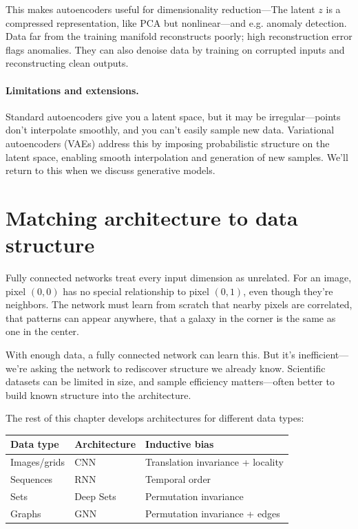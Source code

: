 \documentclass[11pt]{article}
\begin{document}
This makes autoencoders useful for dimensionality reduction---The latent $z$ is a compressed representation, like PCA but nonlinear---and e.g. anomaly detection. Data far from the training manifold reconstructs poorly; high reconstruction error flags anomalies. They can also denoise data by training on corrupted inputs and reconstructing clean outputs.

\paragraph{Limitations and extensions.} Standard autoencoders give you a latent space, but it may be irregular---points don't interpolate smoothly, and you can't easily sample new data. Variational autoencoders (VAEs) address this by imposing probabilistic structure on the latent space, enabling smooth interpolation and generation of new samples. We'll return to this when we discuss generative models.

\section{Matching architecture to data structure}

Fully connected networks treat every input dimension as unrelated. For an image, pixel $(0,0)$ has no special relationship to pixel $(0,1)$, even though they're neighbors. The network must learn from scratch that nearby pixels are correlated, that patterns can appear anywhere, that a galaxy in the corner is the same as one in the center.

With enough data, a fully connected network can learn this. But it's inefficient---we're asking the network to rediscover structure we already know. Scientific datasets can be limited in size, and sample efficiency matters---often better to build known structure into the architecture.

The rest of this chapter develops architectures for different data types:
\begin{center}
\begin{tabular}{lll}
\toprule
\textbf{Data type} & \textbf{Architecture} & \textbf{Inductive bias} \\
\midrule
Images/grids & CNN & Translation invariance + locality \\
Sequences & RNN & Temporal order \\
Sets & Deep Sets & Permutation invariance \\
Graphs & GNN & Permutation invariance + edges \\
\bottomrule
\end{tabular}
\end{center}
\end{document}
